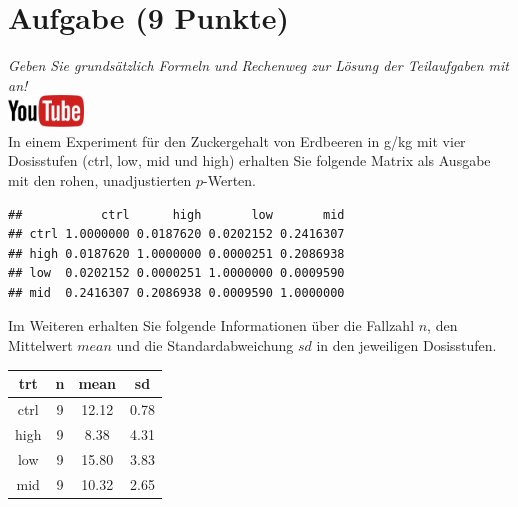 \documentclass[a4paper, 9pt]{scrartcl}\usepackage[]{graphicx}\usepackage[]{xcolor}
\makeatletter
\newenvironment{kframe}{%
 \def\at@end@of@kframe{}%
 \ifinner\ifhmode%
  \def\at@end@of@kframe{\end{minipage}}%
  \begin{minipage}{\columnwidth}%
 \fi\fi%
 \def\FrameCommand##1{\hskip\@totalleftmargin \hskip-\fboxsep
 \colorbox{shadecolor}{##1}\hskip-\fboxsep
     \hskip-\linewidth \hskip-\@totalleftmargin \hskip\columnwidth}%
 \MakeFramed {\advance\hsize-\width
   \@totalleftmargin\z@ \linewidth\hsize
   \@setminipage}}%
 {\par\unskip\endMakeFramed%
 \at@end@of@kframe}
\newenvironment{knitrout}{}{} %
\makeatother
\begin{document}
 
\clearpage

\section{Aufgabe \hfill (9 Punkte)}

\textit{Geben Sie grunds{\"a}tzlich Formeln und Rechenweg zur L{\"o}sung der
  Teilaufgaben mit an!} \\[1Ex]

 \hfill\href{https://youtu.be/RagTFFKFbFg}{\includegraphics[width =
   2cm]{img/youtube}}\\[1Ex]



 
 In einem Experiment f{\"u}r den Zuckergehalt von Erdbeeren in g/kg mit vier
 Dosisstufen (ctrl, low, mid und high) erhalten Sie folgende Matrix als
 \Rlogo Ausgabe mit den rohen, unadjustierten $p$-Werten.



\begin{knitrout}
\color{fgcolor}\begin{kframe}
\begin{verbatim}
##           ctrl      high       low       mid
## ctrl 1.0000000 0.0187620 0.0202152 0.2416307
## high 0.0187620 1.0000000 0.0000251 0.2086938
## low  0.0202152 0.0000251 1.0000000 0.0009590
## mid  0.2416307 0.2086938 0.0009590 1.0000000
\end{verbatim}
\end{kframe}
\end{knitrout}

Im Weiteren erhalten Sie folgende Informationen {\"u}ber die Fallzahl $n$, den
Mittelwert $mean$ und die Standardabweichung $sd$ in den jeweiligen Dosisstufen.

\begin{knitrout}
\color{fgcolor}\begin{table}[!h]
\centering
\begin{tabular}{cccc}
\toprule
trt & n & mean & sd\\
\midrule
ctrl & 9 & 12.12 & 0.78\\
high & 9 & 8.38 & 4.31\\
low & 9 & 15.80 & 3.83\\
mid & 9 & 10.32 & 2.65\\
\bottomrule
\end{tabular}
\end{table}

\end{knitrout}
\end{document}
